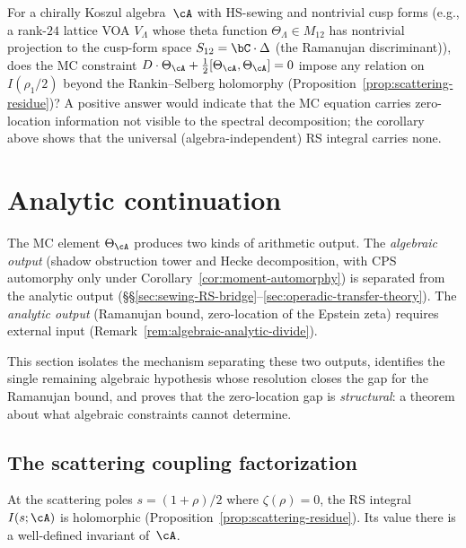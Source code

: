 \begin{problem}%
\label{prob:polyakov-target}%
%
For a chirally Koszul algebra~$\cA$ with HS-sewing and
nontrivial cusp forms (e.g., a rank-$24$ lattice VOA
$V_\Lambda$ whose theta function
$\Theta_\Lambda \in M_{12}$ has nontrivial projection to
the cusp-form space $S_{12} = \bC\cdot\Delta$
\textup{(}the Ramanujan discriminant\textup{)}), does the MC
constraint
$D\cdot\Theta_\cA + \tfrac12[\Theta_\cA, \Theta_\cA] = 0$
impose any relation on $I(\rho_1/2)$ beyond the
Rankin--Selberg holomorphy
(Proposition~\ref{prop:scattering-residue})?
A positive answer would indicate that the MC equation
carries zero-location information not visible to the
spectral decomposition; the corollary above shows that
the universal (algebra-independent) RS integral carries
none.
\end{problem}

\section{Analytic continuation}%
\label{sec:analytic-continuation-theory}%

The MC element $\Theta_\cA$ produces two kinds of arithmetic
output.
The \emph{algebraic output} (shadow obstruction tower and Hecke
decomposition, with CPS automorphy only under
Corollary~\ref{cor:moment-automorphy}) is separated from the analytic
output
\textup{(}\S\S\ref{sec:sewing-RS-bridge}--\ref{sec:operadic-transfer-theory}\textup{)}.
The \emph{analytic output} (Ramanujan bound,
zero-location of the Epstein zeta) requires external input
(Remark~\ref{rem:algebraic-analytic-divide}).

This section isolates the mechanism separating
these two outputs, identifies the single remaining algebraic
hypothesis whose resolution closes the gap for the
Ramanujan bound, and proves that the zero-location gap
is \emph{structural}: a theorem about what algebraic
constraints cannot determine.

\subsection{The scattering coupling factorization}%
\label{subsec:scattering-coupling-factorization}

At the scattering poles $s = (1{+}\rho)/2$ where
$\zeta(\rho) = 0$, the RS integral $I(s;\cA)$
is holomorphic (Proposition~\ref{prop:scattering-residue}).
Its value there is a well-defined invariant of~$\cA$.

